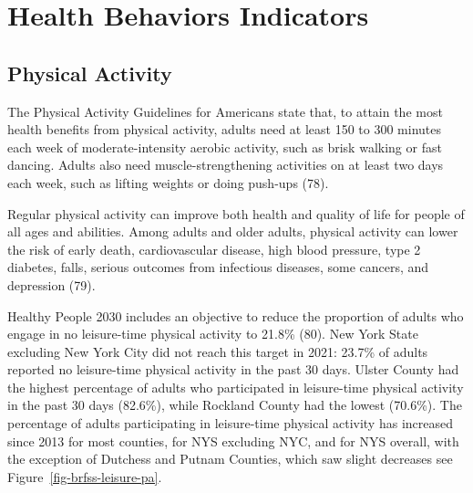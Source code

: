 \documentclass[
  english,
  letterpaper,
]{report}
\begin{document}

\chapter{Health Behaviors Indicators}\label{health-behaviors-indicators}

\section{Physical Activity}\label{physical-activity}

The Physical Activity Guidelines for Americans state that, to attain the
most health benefits from physical activity, adults need at least 150 to
300 minutes each week of moderate-intensity aerobic activity, such as
brisk walking or fast dancing. Adults also need muscle-strengthening
activities on at least two days each week, such as lifting weights or
doing push-ups (78).

Regular physical activity can improve both health and quality of life
for people of all ages and abilities. Among adults and older adults,
physical activity can lower the risk of early death, cardiovascular
disease, high blood pressure, type 2 diabetes, falls, serious outcomes
from infectious diseases, some cancers, and depression (79).

Healthy People 2030 includes an objective to reduce the proportion of
adults who engage in no leisure-time physical activity to 21.8\% (80).
New York State excluding New York City did not reach this target in
2021: 23.7\% of adults reported no leisure-time physical activity in the
past 30 days. Ulster County had the highest percentage of adults who
participated in leisure-time physical activity in the past 30 days
(82.6\%), while Rockland County had the lowest (70.6\%). The percentage
of adults participating in leisure-time physical activity has increased
since 2013 for most counties, for NYS excluding NYC, and for NYS
overall, with the exception of Dutchess and Putnam Counties, which saw
slight decreases see Figure~\ref{fig-brfss-leisure-pa}.
\end{document}
